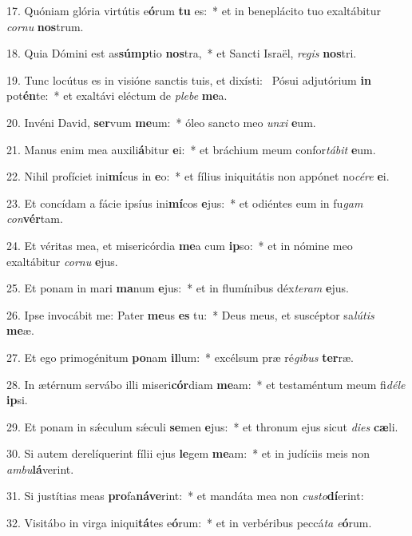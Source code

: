 17. Quóniam glória virtútis e\textbf{ó}rum \textbf{tu} es:~*  et in beneplácito tuo exaltábitur \textit{cor}\textit{nu} \textbf{nos}trum.\

18. Quia Dómini est as\textbf{súmp}tio \textbf{nos}tra,~*  et Sancti Israël, \textit{re}\textit{gis} \textbf{nos}tri.\

19. Tunc locútus es in visióne sanctis tuis, et dixísti: \dag\  Pósui adjutórium \textbf{in} pot\textbf{én}te:~*  et exaltávi eléctum de \textit{ple}\textit{be} \textbf{me}a.\

20. Invéni David, \textbf{ser}vum \textbf{me}um:~*  óleo sancto meo \textit{un}\textit{xi} \textbf{e}um.\

21. Manus enim mea auxili\textbf{á}bitur \textbf{e}i:~*  et bráchium meum confor\textit{tá}\textit{bit} \textbf{e}um.\

22. Nihil profíciet ini\textbf{mí}cus in \textbf{e}o:~*  et fílius iniquitátis non appónet no\textit{cé}\textit{re} \textbf{e}i.\

23. Et concídam a fácie ipsíus ini\textbf{mí}cos \textbf{e}jus:~*  et odiéntes eum in fu\textit{gam} \textit{con}\textbf{vér}tam.\

24. Et véritas mea, et misericórdia \textbf{me}a cum \textbf{ip}so:~*  et in nómine meo exaltábitur \textit{cor}\textit{nu} \textbf{e}jus.\

25. Et ponam in mari \textbf{ma}num \textbf{e}jus:~*  et in flumínibus déx\textit{te}\textit{ram} \textbf{e}jus.\

26. Ipse invocábit me: Pater \textbf{me}us \textbf{es} tu:~*  Deus meus, et suscéptor sa\textit{lú}\textit{tis} \textbf{me}æ.\

27. Et ego primogénitum \textbf{po}nam \textbf{il}lum:~*  excélsum præ ré\textit{gi}\textit{bus} \textbf{ter}ræ.\

28. In ætérnum servábo illi miseri\textbf{cór}diam \textbf{me}am:~*  et testaméntum meum fi\textit{dé}\textit{le} \textbf{ip}si.\

29. Et ponam in sǽculum sǽculi \textbf{se}men \textbf{e}jus:~*  et thronum ejus sicut \textit{di}\textit{es} \textbf{cæ}li.\

30. Si autem derelíquerint fílii ejus \textbf{le}gem \textbf{me}am:~*  et in judíciis meis non \textit{am}\textit{bu}\textbf{lá}verint.\

31. Si justítias meas \textbf{pro}fa\textbf{ná}\textbf{ve}rint:~*  et mandáta mea non \textit{cus}\textit{to}\textbf{dí}erint:\

32. Visitábo in virga iniqui\textbf{tá}tes e\textbf{ó}rum:~*  et in verbéribus peccá\textit{ta} \textit{e}\textbf{ó}rum.\


